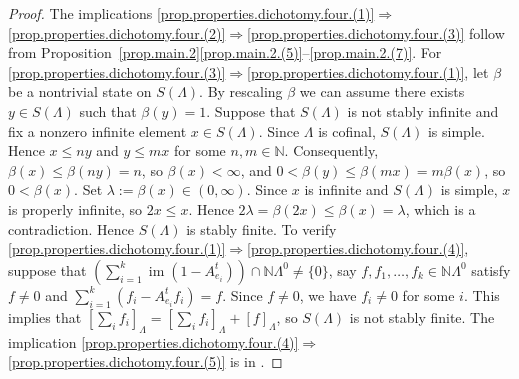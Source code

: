 \documentclass[a4paper, 12pt]{amsart}
\numberwithin{equation}{section}
\theoremstyle{remark}
\theoremstyle{definition}
\begin{document}
\begin{proof}
The implications
\eqref{prop.properties.dichotomy.four.(1)}$\Rightarrow$\eqref{prop.properties.dichotomy.four.(2)}$\Rightarrow$\eqref{prop.properties.dichotomy.four.(3)}
follow from
Proposition~\ref{prop.main.2}\eqref{prop.main.2.(5)}--\eqref{prop.main.2.(7)}. For
\eqref{prop.properties.dichotomy.four.(3)}$\Rightarrow$\eqref{prop.properties.dichotomy.four.(1)},
let $\beta$ be a nontrivial state on $S(\Lambda)$. By rescaling $\beta$ we can assume
there exists $y\in S(\Lambda)$ such that $\beta(y)=1$. Suppose that $S(\Lambda)$ is not
stably infinite and fix a nonzero infinite element $x\in S(\Lambda)$. Since $\Lambda$ is
cofinal, $S(\Lambda)$ is simple. Hence $x\leq n y$ and $y\leq m x$ for some $n,m\in {\mathbb{N}}$.
Consequently, $\beta(x)\leq \beta(ny)=n$, so $\beta(x)<\infty$, and $0<\beta(y)\leq
\beta(mx)=m\beta(x)$, so $0<\beta(x)$. Set $\lambda:=\beta(x)\in(0,\infty)$. Since $x$ is
infinite and $S(\Lambda)$ is simple, $x$ is properly infinite, so $2x\leq x$. Hence
$2\lambda=\beta(2x)\leq \beta(x)=\lambda$, which is a contradiction. Hence $S(\Lambda)$
is stably finite. To verify
\eqref{prop.properties.dichotomy.four.(1)}$\Rightarrow$\eqref{prop.properties.dichotomy.four.(4)},
suppose that $(\sum_{i=1}^k{\operatorname{im}}(1-A^t_{e_i})) \cap {\mathbb{N}}\Lambda^0\neq \{0\}$, say $f,
f_1,\dots, f_k\in {\mathbb{N}}\Lambda^0$ satisfy $f\neq 0$ and $\sum_{i=1}^k (f_i-A^t_{e_i}f_i) =
f $. Since $f\neq 0$, we have $f_i\neq 0$ for some $i$. This implies that
${{[{\sum_if_i}]_\Lambda}}={{[{\sum_if_i}]_\Lambda}}+{{[{f}]_\Lambda}}$, so $S(\Lambda)$ is not stably finite.
The implication
\eqref{prop.properties.dichotomy.four.(4)}$\Rightarrow$\eqref{prop.properties.dichotomy.four.(5)}
is in \cite[Proposition~3.6]{MR3507995}.


\end{proof}
\end{document}
